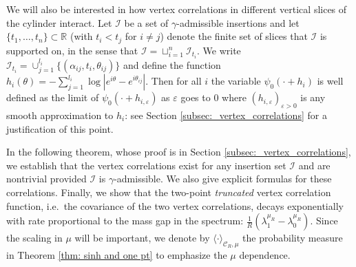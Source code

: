 \documentclass[11pt]{amsart}
\numberwithin{equation}{section}
\theoremstyle{definition}
\newcommand{\R}{\mathbb{R}}
\newcommand{\cjd}{\rangle}
\newcommand{\cjg}{\langle}
\newcommand{\mc}{\mathcal}
\newcommand{\la}{\lambda}
\def\eps{\varepsilon}
\begin{document}
We will also be interested in how vertex correlations in different vertical slices of the cylinder interact. Let $\mathcal{I}$ be a set of $\gamma$-admissible insertions and let $\{t_1,\dots,t_n\}\subset \R$ (with $t_i<t_j$ for $i \not = j$) denote the finite set of slices that $\mathcal{I}$ is supported on, in the sense that
$\mathcal{I}=\sqcup_{i=1}^n \mathcal{I}_{t_i}$. We write $\mathcal{I}_{t_i}= \cup_{j=1}^{l_i} \lbrace   (\alpha_{ij},t_i, \theta_{ij}) \rbrace$ and define the function $h_i(\theta)= -\sum_{j=1}^{l_i} \log |e^{i\theta}-e^{i \theta_{ij}}|$. Then for all $i$ the variable $\psi_0(\cdot+ h_i)$ is well defined as the limit of $\psi_0(\cdot+ h_{i,\eps})$ as $\eps$ goes to $0$ where $(h_{i,\eps})_{\eps >0}$ is any smooth approximation to $h_i$: see Section \ref{subsec:_vertex_correlations} for a justification of this point.

In the following theorem, whose proof is in Section \ref{subsec:_vertex_correlations}, we establish that the vertex correlations exist for any insertion set $\mathcal{I}$ and are nontrivial provided $\mathcal{I}$ is $\gamma$-admissible. We also give explicit formulas for these correlations. Finally, we show that the two-point \emph{truncated} vertex correlation function, i.e.\ the covariance of the two vertex correlations, decays exponentially with rate proportional to the mass gap in the spectrum: $\frac{1}{R}(\la_1^{\mu_R}-\la_0^{\mu_R})$. Since the scaling in $\mu$ will be important, we denote by $\cjg \cdot\cjd_{\mc{C}_R,\mu}$ the probability measure in Theorem \ref{thm: sinh and one pt} to emphasize the $\mu$ dependence.
 
\end{document}
